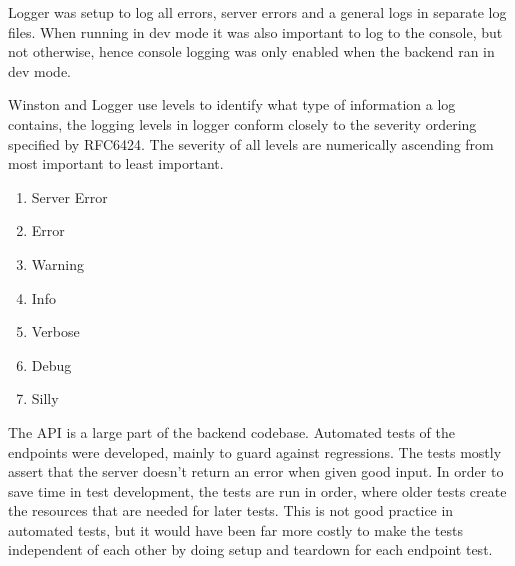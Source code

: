 Logger was setup to log all errors, server errors and a general logs in separate log files. When running in dev mode it was also important to log to the console, but not otherwise, hence console logging was only enabled when the backend ran in dev mode. 

Winston and Logger use levels to identify what type of information a log contains, the logging levels in logger conform closely to the severity ordering specified by RFC6424.
The severity of all levels are numerically ascending from most important to least important.

\begin{enumerate}
  \item Server Error
  \item Error
  \item Warning
  \item Info
  \item Verbose
  \item Debug
  \item Silly
\end{enumerate}

The API is a large part of the backend codebase. Automated tests of the endpoints were developed, mainly to guard against regressions. The tests mostly assert that the server doesn't return an error when given good input. In order to save time in test development, the tests are run in order, where older tests create the resources that are needed for later tests. This is not good practice in automated tests, but it would have been far more costly to make the tests independent of each other by doing setup and teardown for each endpoint test.
